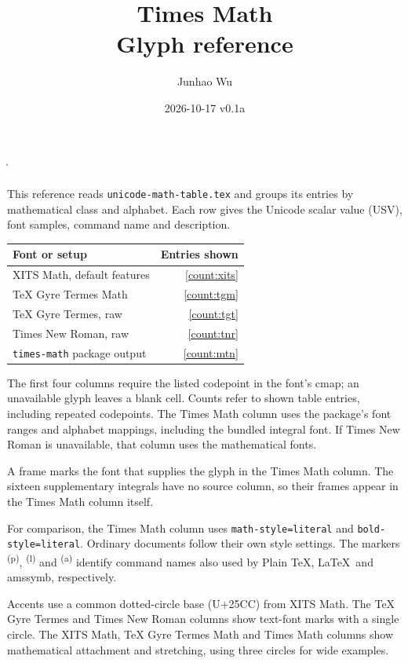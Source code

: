 \documentclass[a4paper,final]{article}
\newcounter{mtn}\setcounter{mtn}{-1}
\begin{document}
\MakeShortVerb\|
\title{Times Math\\[.3ex]\large Glyph reference}
\author{Junhao Wu}
\date{2026-10-17 \quad v0.1a}
\maketitle

This reference reads \texttt{unicode-math-table.tex} and groups its entries
by mathematical class and alphabet. Each row gives the Unicode scalar
value (USV), font samples, command name and description.

\begin{center}
\begin{tabular}{@{}lr@{}}
\toprule
Font or setup & Entries shown\\
\midrule
XITS Math, default features & \ref{count:xits}\\
TeX Gyre Termes Math & \ref{count:tgm}\\
TeX Gyre Termes, raw & \ref{count:tgt}\\
Times New Roman, raw & \ref{count:tnr}\\
\texttt{times-math} package output & \ref{count:mtn}\\
\bottomrule
\end{tabular}
\end{center}

The first four columns require the listed codepoint in the font's cmap;
an unavailable glyph leaves a blank cell. Counts refer to shown table
entries, including repeated codepoints. The Times Math column uses the
package's font ranges and alphabet mappings, including the bundled integral
font. If Times New Roman is unavailable, that column uses the mathematical
fonts.

A frame marks the font that supplies the glyph in the Times Math column.
The sixteen supplementary integrals have no source column, so their frames
appear in the Times Math column itself.

For comparison, the Times Math column uses \texttt{math-style=literal} and
\texttt{bold-style=literal}. Ordinary documents follow their own style
settings. The markers {\color[gray]{0.6}\textsuperscript{\sffamily (p)}},
{\color[gray]{0.6}\textsuperscript{\sffamily (l)}} and
{\color[gray]{0.6}\textsuperscript{\sffamily (a)}} identify command names
also used by Plain \TeX, \LaTeX\ and \textsf{amssymb}, respectively.

Accents use a common dotted-circle base (U+25CC) from XITS Math.
The TeX Gyre Termes and Times New Roman columns show text-font marks with a
single circle. The XITS Math, TeX Gyre Termes Math and Times Math columns
show mathematical attachment and stretching, using three circles for wide
examples.
\end{document}
